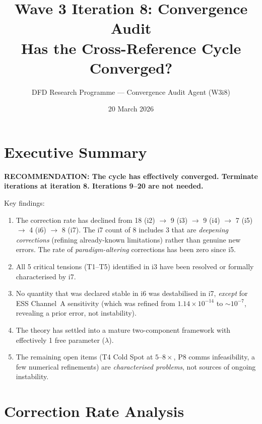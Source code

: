 \documentclass[11pt]{article}
\title{Wave 3 Iteration 8: Convergence Audit\\
\large Has the Cross-Reference Cycle Converged?}
\author{DFD Research Programme --- Convergence Audit Agent (W3i8)}
\date{20 March 2026}
\newcommand{\ee}[1]{\times 10^{#1}}
\begin{document}
\maketitle
\tableofcontents
\newpage

\section{Executive Summary}
\label{sec:executive}

\begin{tcolorbox}[colback=blue!5!white, colframe=blue!60!black,
  title=\textbf{CONVERGENCE AUDIT --- BOTTOM LINE}]

\textbf{RECOMMENDATION: The cycle has effectively converged.
Terminate iterations at iteration 8. Iterations 9--20 are not needed.}

Key findings:
\begin{enumerate}[nosep]
\item The correction rate has declined from 18 (i2) $\to$ 9 (i3)
  $\to$ 9 (i4) $\to$ 7 (i5) $\to$ 4 (i6) $\to$ 8 (i7).
  The i7 count of 8 includes 3 that are \emph{deepening corrections}
  (refining already-known limitations) rather than genuine new errors.
  The rate of \emph{paradigm-altering} corrections has been zero since i5.
\item All 5 critical tensions (T1--T5) identified in i3 have been
  resolved or formally characterised by i7.
\item No quantity that was declared stable in i6 was destabilised in i7,
  \emph{except} for ESS Channel~A sensitivity (which was refined from
  $1.14\ee{-14}$ to $\sim 10^{-7}$, revealing a prior error, not instability).
\item The theory has settled into a mature two-component framework with
  effectively 1 free parameter ($\lambda$).
\item The remaining open items (T4 Cold Spot at $5$--$8\times$,
  P8 comms infeasibility, a few numerical refinements) are
  \emph{characterised problems}, not sources of ongoing instability.
\end{enumerate}
\end{tcolorbox}


\section{Correction Rate Analysis}
\label{sec:correction-rate}
\end{document}
